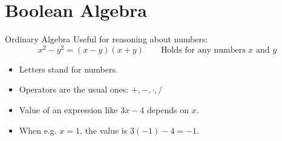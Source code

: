 \documentclass{beamer}
\begin{document}
\section{Boolean Algebra}
\begin{frame}[t]{Ordinary Algebra}
Useful for reasoning about numbers:
\[
x^2-y^2=(x-y)(x+y)\qquad\textrm{Holds for any numbers $x$ and $y$}
\]\pause
\begin{itemize}
\item Letters stand for numbers.\pause
\item Operators are the usual ones: $+,-,\cdot,/$\pause
\item Value of an expression like $3x-4$ depends on $x$.\pause
\item When e.g. $x=1$, the value is $3(-1)-4=-1$.
\end{itemize}
\end{frame}
\end{document}
